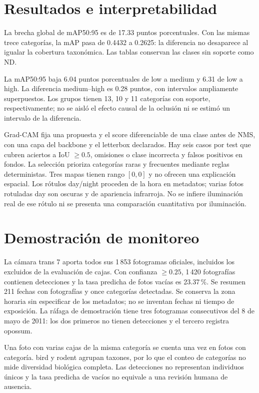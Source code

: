 \section{Resultados e interpretabilidad}

La brecha global de mAP50:95 es de 17.33 puntos porcentuales. Con las mismas trece
categorías, la mAP pasa de 0.4432 a 0.2625: la diferencia no desaparece al igualar
la cobertura taxonómica. Las tablas conservan las clases sin soporte como ND.


La mAP50:95 baja 6.04 puntos porcentuales de low a medium y 6.31 de low a high.
La diferencia medium--high es 0.28 puntos, con intervalos ampliamente superpuestos.
Los grupos tienen 13, 10 y 11 categorías con soporte, respectivamente; no se aisló
el efecto causal de la oclusión ni se estimó un intervalo de la diferencia.


Grad-CAM fija una propuesta y el score diferenciable de una clase antes de NMS,
con una capa del backbone y el letterbox declarados. Hay seis casos por test que
cubren aciertos a IoU $\geq0.5$, omisiones o clase incorrecta y falsos positivos en
fondos. La selección prioriza categorías raras y frecuentes mediante reglas
 deterministas. Tres mapas tienen rango $[0,0]$ y no ofrecen una explicación espacial.
Los rótulos day/night proceden de la hora en metadatos; varias fotos rotuladas day
son oscuras y de apariencia infrarroja. No se infiere iluminación real de ese rótulo
ni se presenta una comparación cuantitativa por iluminación.

\section{Demostración de monitoreo}
La cámara trans 7 aporta todos sus 1\,853 fotogramas oficiales, incluidos los excluidos
 de la evaluación de cajas. Con confianza $\geq0.25$, 1\,420 fotografías contienen
 detecciones y la tasa predicha de fotos vacías es 23.37\,\%. Se resumen 211 fechas
con fotografías y once categorías detectadas. Se conserva la zona horaria sin
especificar de los metadatos; no se inventan fechas ni tiempo de exposición.
La ráfaga de demostración tiene tres fotogramas consecutivos del 8 de mayo de 2011:
los dos primeros no tienen detecciones y el tercero registra opossum.

Una foto con varias cajas de la misma categoría se cuenta una vez en fotos con
categoría. bird y rodent agrupan taxones, por lo que el conteo de categorías no mide
 diversidad biológica completa. Las detecciones no representan individuos únicos y
la tasa predicha de vacíos no equivale a una revisión humana de ausencia.

